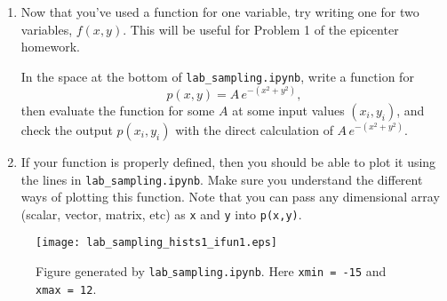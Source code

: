 \documentclass[11pt,titlepage,fleqn]{article}
\begin{document}
\begin{enumerate}
\item Now that you've used a function for one variable, try writing one for two variables, $f(x,y)$. This will be useful for Problem 1 of the epicenter homework.

In the space at the bottom of \verb+lab_sampling.ipynb+, write a function for 
%
\begin{equation*}
p(x,y) = A\,e^{-(x^2+y^2)},
\end{equation*}
%
then evaluate the function for some $A$ at some input values $(x_i,y_i)$, and check the output $p(x_i,y_i)$ with the direct calculation of $A\,e^{-(x^2+y^2)}$.

\item If your function is properly defined, then you should be able to plot it using the lines in \verb+lab_sampling.ipynb+. Make sure you understand the different ways of plotting this function. Note that you can pass any dimensional array (scalar, vector, matrix, etc) as \verb+x+ and \verb+y+ into \verb+p(x,y)+.

\end{enumerate}


\begin{figure}
\centering
\texttt{[image: lab\_sampling\_hists1\_ifun1.eps]}
\caption[]
{{
Figure generated by {\tt lab$\_$sampling.ipynb}. %
Here {\tt xmin = -15} and {\tt xmax = 12}.
\label{fig}
}}
\end{figure}


\clearpage\pagebreak



\end{document}

